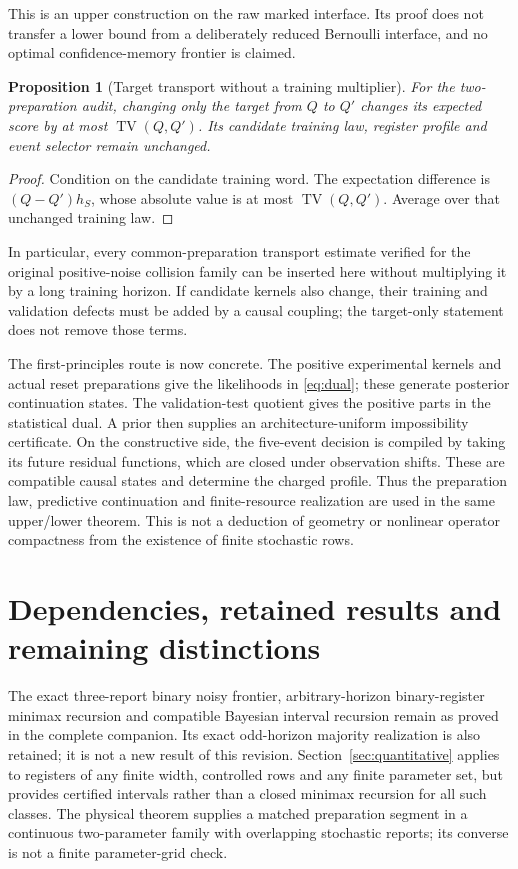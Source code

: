 \documentclass[11pt]{amsart}
\newtheorem{proposition}[theorem]{Proposition}
\theoremstyle{definition}\newtheorem{definition}[theorem]{Definition}
\theoremstyle{remark}\newtheorem{remark}[theorem]{Remark}
\newcommand{\TV}{\operatorname{TV}}
\newcommand{\1}{\mathbf 1}
\begin{document}
This is an upper construction on the raw marked interface. Its proof
does not transfer a lower bound from a deliberately reduced Bernoulli
interface, and no optimal confidence-memory frontier is claimed.

\begin{proposition}[Target transport without a training multiplier]
\label{prop:transport}
For the two-preparation audit, changing only the target from $Q$ to $Q'$
changes its expected score by at most $\TV(Q,Q')$. Its candidate training
law, register profile and event selector remain unchanged.
\end{proposition}
\begin{proof}
Condition on the candidate training word. The expectation difference is
$(Q-Q')h_S$, whose absolute value is at most $\TV(Q,Q')$. Average over
that unchanged training law.
\end{proof}
In particular, every common-preparation transport estimate verified for
the original positive-noise collision family can be inserted here
without multiplying it by a long training horizon. If candidate kernels
also change, their training and validation defects must be added by a
causal coupling; the target-only statement does not remove those terms.

The first-principles route is now concrete. The positive experimental
kernels and actual reset preparations give the likelihoods in
\eqref{eq:dual}; these generate posterior continuation states. The
validation-test quotient gives the positive parts in the statistical
dual. A prior then supplies an architecture-uniform impossibility
certificate. On the constructive side, the five-event decision is
compiled by taking its future residual functions, which are closed under
observation shifts. These are compatible causal states and determine the
charged profile. Thus the preparation law, predictive continuation and
finite-resource realization are used in the same upper/lower theorem.
This is not a deduction of geometry or nonlinear operator compactness
from the existence of finite stochastic rows.



\section{Dependencies, retained results and remaining distinctions}
The exact three-report binary noisy frontier, arbitrary-horizon
binary-register minimax recursion and compatible Bayesian interval
recursion remain as proved in the complete companion. Its exact
odd-horizon majority realization is also retained; it is not a new result
of this revision. Section~\ref{sec:quantitative} applies to registers
of any finite width, controlled rows and any finite parameter set, but
provides certified intervals rather than a closed minimax recursion for
all such classes. The physical theorem supplies a matched preparation
segment in a continuous two-parameter family with overlapping stochastic
reports; its converse is not a finite parameter-grid check.
\end{document}
